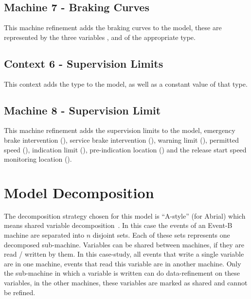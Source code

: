 \documentclass{template/openetcs_article}
\begin{document}
{\footnotesize


\subsection{Machine 7 - Braking Curves}
\label{sec:machine-7-braking}

This machine refinement adds the braking curves to the model, these are
represented by the three variables ,  and  of the
appropriate type.

{\footnotesize

}

\subsection{Context 6 - Supervision Limits}
\label{sec:cont-6-superv}

This context adds the type  to the model, as well
as a constant value of that type.

{\footnotesize

}

\subsection{Machine 8 - Supervision Limit}
\label{sec:mach-8-superv}

This machine refinement adds the supervision limits to the model, emergency
brake intervention (), service brake intervention (),
warning limit (), permitted speed (),
indication limit (), pre-indication location ()
and the release start speed monitoring location ().

{\footnotesize

}

\section{Model Decomposition}
\label{sec:model-decomposition}

The decomposition strategy chosen for this model is ``A-style'' (for Abrial)
which means shared variable decomposition~\cite{silva2011decomposition}. In this
case the events of an Event-B machine are separated into $n$ disjoint sets. Each
of these sets represents one decomposed sub-machine. Variables can be shared
between machines, if they are read / written by them. In this case-study, all
events that write a single variable are in one machine, events that read this
variable are in another machine. Only the sub-machine in which a variable is
written can do data-refinement on these variables, in the other machines, these
variables are marked as shared and cannot be refined.

}
\end{document}
